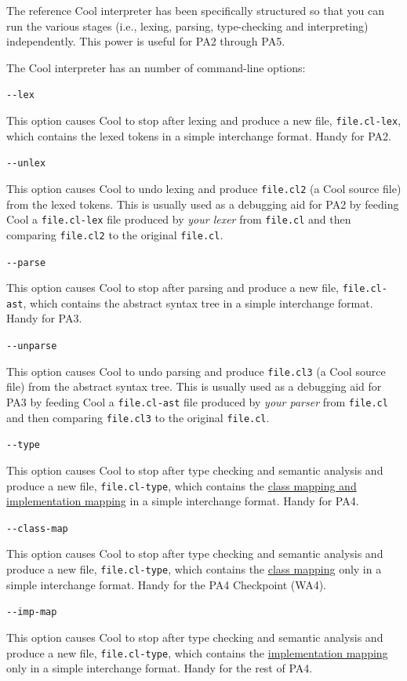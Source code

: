 \documentclass[]{article}
\begin{document}
The reference Cool interpreter has been specifically structured so that
you can run the various stages (i.e., lexing, parsing, type-checking and
interpreting) independently. This power is useful for PA2 through PA5.

The Cool interpreter has an number of command-line options:

\texttt{-{}-lex}

This option causes Cool to stop after lexing and produce a new file,
\texttt{file.cl-lex}, which contains the lexed tokens in a simple
interchange format. Handy for PA2.

\texttt{-{}-unlex}

This option causes Cool to undo lexing and produce \texttt{file.cl2} (a
Cool source file) from the lexed tokens. This is usually used as a
debugging aid for PA2 by feeding Cool a \texttt{file.cl-lex} file
produced by \emph{your lexer} from \texttt{file.cl} and then comparing
\texttt{file.cl2} to the original \texttt{file.cl}.

\texttt{-{}-parse}

This option causes Cool to stop after parsing and produce a new file,
\texttt{file.cl-ast}, which contains the abstract syntax tree in a
simple interchange format. Handy for PA3.

\texttt{-{}-unparse}

This option causes Cool to undo parsing and produce \texttt{file.cl3} (a
Cool source file) from the abstract syntax tree. This is usually used as
a debugging aid for PA3 by feeding Cool a \texttt{file.cl-ast} file
produced by \emph{your parser} from \texttt{file.cl} and then comparing
\texttt{file.cl3} to the original \texttt{file.cl}.

\texttt{-{}-type}

This option causes Cool to stop after type checking and semantic
analysis and produce a new file, \texttt{file.cl-type}, which contains
the \href{node47.html}{class mapping and implementation mapping} in a
simple interchange format. Handy for PA4.

\texttt{-{}-class-map}

This option causes Cool to stop after type checking and semantic
analysis and produce a new file, \texttt{file.cl-type}, which contains
the \href{node47.html}{class mapping} only in a simple interchange
format. Handy for the PA4 Checkpoint (WA4).

\texttt{-{}-imp-map}

This option causes Cool to stop after type checking and semantic
analysis and produce a new file, \texttt{file.cl-type}, which contains
the \href{node47.html}{implementation mapping} only in a simple
interchange format. Handy for the rest of PA4.
\end{document}
